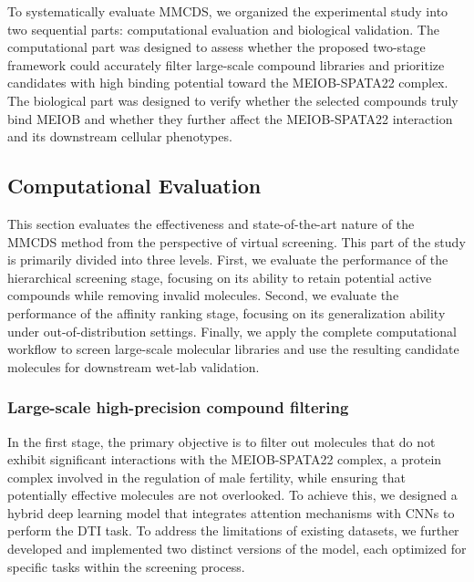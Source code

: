 \documentclass[unnumsec,webpdf,contemporary,large]{oup-authoring-template}%
\theoremstyle{thmstyleone}%
\theoremstyle{thmstyletwo}%
\theoremstyle{thmstylethree}%
\begin{document}
To systematically evaluate MMCDS, we organized the experimental study into two sequential parts: computational evaluation and biological validation. The computational part was designed to assess whether the proposed two-stage framework could accurately filter large-scale compound libraries and prioritize candidates with high binding potential toward the MEIOB-SPATA22 complex. The biological part was designed to verify whether the selected compounds truly bind MEIOB and whether they further affect the MEIOB-SPATA22 interaction and its downstream cellular phenotypes.



\subsection*{Computational Evaluation}

This section evaluates the effectiveness and state-of-the-art nature of the MMCDS method from the perspective of virtual screening. This part of the study is primarily divided into three levels. First, we evaluate the performance of the hierarchical screening stage, focusing on its ability to retain potential active compounds while removing invalid molecules. Second, we evaluate the performance of the affinity ranking stage, focusing on its generalization ability under out-of-distribution settings. Finally, we apply the complete computational workflow to screen large-scale molecular libraries and use the resulting candidate molecules for downstream wet-lab validation.

\subsubsection*{Large-scale high-precision compound filtering} %

In the first stage, the primary objective is to filter out molecules that do not exhibit significant interactions with the MEIOB-SPATA22 complex, a protein complex involved in the regulation of male fertility, while ensuring that potentially effective molecules are not overlooked. To achieve this, we designed a hybrid deep learning model that integrates attention mechanisms with CNNs to perform the DTI task. To address the limitations of existing datasets, we further developed and implemented two distinct versions of the model, each optimized for specific tasks within the screening process.
\end{document}
